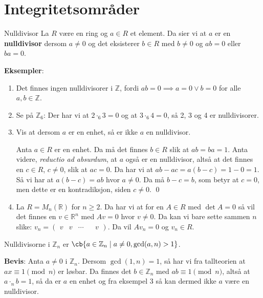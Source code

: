 \section{Integritetsområder}
\begin{definition}{Nulldivisor}{}
  La $R$ være en ring og $a\in R$ et element. Da sier vi at $a$ er en \textbf{nulldivisor} dersom
  $a \neq 0$ og det eksisterer $b\in R$ med $b \neq 0$ og $ab = 0$ eller $ba = 0$. 
\end{definition}

\textbf{Eksempler}:
\begin{enumerate}
  \item Det finnes ingen nulldivisorer i $\mathbb{Z}$, fordi $ab = 0 \implies a = 0 \vee b = 0$ for
    alle $a, b \in \mathbb{Z}$. 
  \item Se på $\mathbb{Z}_6$: Der har vi at $2\cdot_6 3 = 0$ og at $3\cdot_6 4 = 0$, så 2, 3 og 4
    er nulldivisorer.
  \item Vis at dersom $a$ er en enhet, så er ikke $a$ en nulldivisor. 

    Anta $a\in R$ er en enhet. Da må det finnes $b\in R$ slik at $ab = ba = 1$. Anta videre,
    \textit{reductio ad absurdum}, at $a$ også er en nulldivisor, altså at det finnes en 
    $c\in R$, $c\neq 0$, slik at $ac = 0$. Da har vi at $ab - ac = a(b-c) = 1 - 0 = 1$. Så vi 
    har at $a(b-c) = ab$ hvor $a \neq 0$. Da må $b-c = b$, som betyr at $c = 0$, men dette er en
    kontradiksjon, siden $c \neq 0$. \qed
  \item La $R = M_n(\mathbb{R})$ for $n\geq 2$. Da har vi at for en $A\in R$ med $\det A = 0$ så
    vil det finnes en $v\in \mathbb{R}^n$ med $Av = 0$ hvor $v \neq 0$. Da kan vi bare 
    sette sammen $n$ slike: $v_n = \begin{pmatrix} v & v & \cdots && v \end{pmatrix}$. Da vil
    $Av_n = 0$ og $v_n \in R$. 
\end{enumerate}

\begin{theorem*}{19.3}{}
  Nulldivisorne i $\mathbb{Z}_n$ er $\cb{a\in \mathbb{Z}_n\mid a\neq 0, \gcd(a, n) > 1}$. 
\end{theorem*}

\textbf{Bevis}:
Anta $a \neq 0$ i $\mathbb{Z}_n$. Dersom $\gcd(1, n) = 1$, så har vi fra tallteorien at 
$ax \equiv 1 \pmod{n}$ er løsbar. Da finnes det $b\in \mathbb{Z}_n$ med $ab \equiv 1\pmod{n}$,
altså at $a\cdot_n b = 1$, så da er $a$ en enhet og fra eksempel 3 så kan dermed ikke $a$ være
en nulldivisor. 

